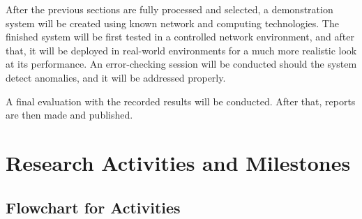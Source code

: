 \documentclass[a4paper, 12pt]{article}
\begin{document}
After the previous sections are fully processed and selected, a demonstration system will be created using known network and computing technologies. The finished system will be first tested in a controlled network environment, and after that, it will be deployed in real-world environments for a much more realistic look at its performance. An error-checking session will be conducted should the system detect anomalies, and it will be addressed properly. 

A final evaluation with the recorded results will be conducted. After that, reports are then made and published. 

\clearpage

\section{Research Activities and Milestones}

\subsection{Flowchart for Activities}
\end{document}
